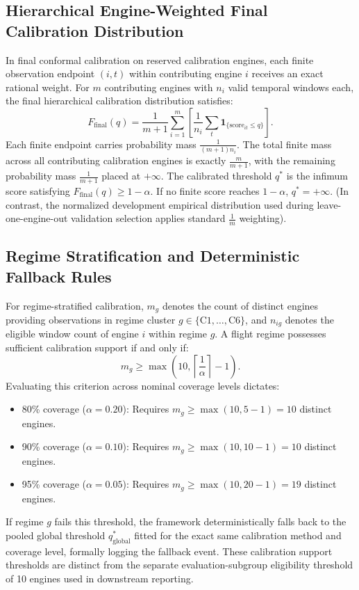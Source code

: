 \subsection*{Hierarchical Engine-Weighted Final Calibration Distribution}
In final conformal calibration on reserved calibration engines, each finite observation endpoint $(i, t)$ within contributing engine $i$ receives an exact rational weight. For $m$ contributing engines with $n_i$ valid temporal windows each, the final hierarchical calibration distribution satisfies:
\begin{equation}
F_{\text{final}}(q) = \frac{1}{m+1} \sum_{i=1}^m \left[ \frac{1}{n_i} \sum_{t} \mathbf{1}_{\{\text{score}_{it} \le q\}} \right].
\end{equation}
Each finite endpoint carries probability mass $\frac{1}{(m+1)n_i}$. The total finite mass across all contributing calibration engines is exactly $\frac{m}{m+1}$, with the remaining probability mass $\frac{1}{m+1}$ placed at $+\infty$. The calibrated threshold $q^*$ is the infimum score satisfying $F_{\text{final}}(q) \ge 1 - \alpha$. If no finite score reaches $1 - \alpha$, $q^* = +\infty$. (In contrast, the normalized development empirical distribution used during leave-one-engine-out validation selection applies standard $\frac{1}{m}$ weighting).

\subsection*{Regime Stratification and Deterministic Fallback Rules}
For regime-stratified calibration, $m_g$ denotes the count of distinct engines providing observations in regime cluster $g \in \{\text{C1}, \dots, \text{C6}\}$, and $n_{ig}$ denotes the eligible window count of engine $i$ within regime $g$. A flight regime possesses sufficient calibration support if and only if:
\begin{equation}
m_g \ge \max\left(10, \left\lceil \frac{1}{\alpha} \right\rceil - 1\right).
\end{equation}
Evaluating this criterion across nominal coverage levels dictates:
\begin{itemize}
    \item 80\% coverage ($\alpha = 0.20$): Requires $m_g \ge \max(10, 5 - 1) = 10$ distinct engines.
    \item 90\% coverage ($\alpha = 0.10$): Requires $m_g \ge \max(10, 10 - 1) = 10$ distinct engines.
    \item 95\% coverage ($\alpha = 0.05$): Requires $m_g \ge \max(10, 20 - 1) = 19$ distinct engines.
\end{itemize}
If regime $g$ fails this threshold, the framework deterministically falls back to the pooled global threshold $q^*_{\text{global}}$ fitted for the exact same calibration method and coverage level, formally logging the fallback event. These calibration support thresholds are distinct from the separate evaluation-subgroup eligibility threshold of 10 engines used in downstream reporting.

